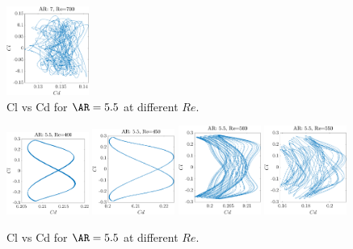 \begin{figure}
  \centering
  \includegraphics[width=0.24\textwidth]{./fig/nnl/ClCdAR7RE700.png}
  \caption{Cl vs Cd for $\AR=5.5$ at different $Re$.}
  \label{fig:ClCd}
\end{figure}


\begin{figure}
  \centering
  \includegraphics[width=0.24\textwidth]{./fig/nnl/ClCdAR5.5RE400.png}
  \includegraphics[width=0.24\textwidth]{./fig/nnl/ClCdAR5.5RE450.png}
  \includegraphics[width=0.24\textwidth]{./fig/nnl/ClCdAR5.5RE500.png}
  \includegraphics[width=0.24\textwidth]{./fig/nnl/ClCdAR5.5RE550.png}
  \caption{Cl vs Cd for $\AR=5.5$ at different $Re$.}
  \label{fig:ClCd}
\end{figure}

